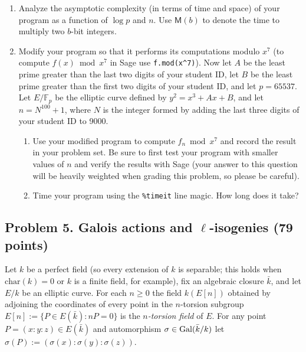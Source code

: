 \documentclass[11pt]{article}
\newcommand{\Fp}{\mathbb{F}_p}
\newcommand{\M}{\textsf{M}}
\newcommand{\Gal}{{\rm Gal}}
\newcommand{\kbar}{\bar{k}}
\begin{document}
\begin{enumerate}[{\bf (a)}]
\begin{itemize}
Implement a function that, given $k$, $v=[f_{k-3},\ldots,f_{k+5}]$, $F$, and a bit $b$, computes $k'=2k+b$ and $v=[f_{k'-3},\ldots,f_{k'+5}]$.  To perform left-to-right binary exponentiation, call this function repeatedly, passing in the bits of $n$ starting from either 2 or 3 bits from in the top and working down to the low order bit.
\item
To test your code, you can compare results with Sage, which already knows how to compute $f_n$, via
\begin{lstlisting}
FF=GF(p); R.<x>=PolynomialRing(FF)
E=EllipticCurve([FF(A),FF(B)])
E.division_polynomial(n,x,0)
\end{lstlisting}
\item
Your program should be quite fast, but be careful not to test it with values of $n$ that are too large --- the degree of $f_n$ is quadratic in $n$, so if $n$ is, say, a million, you would need several terabytes of memory to store $f_n$.
\end{itemize}
\item
Analyze the asymptotic complexity (in terms of time and space) of your program as a function of $\log p$ and $n$.
Use $\M(b)$ to denote the time to multiply two $b$-bit integers.

\item
Modify your program so that it performs its computations modulo $x^7$ (to compute $f(x)\bmod x^7$ in Sage use \texttt{f.mod(x\^{}7)}).
Now let $A$ be the least prime greater than the last two digits of your student ID, let $B$ be the least prime greater than the first two digits of your student ID, and let $p=65537$.  Let $E/\Fp$ be the elliptic curve defined by $y^2=x^3+Ax+B$, and let $n=N^{100}+1$, where $N$ is the integer formed by adding the last three digits of your student ID to 9000.
\begin{enumerate}[{\bf (i)}]
\item
Use your modified program to compute $f_n\bmod x^7$ and record the result in your problem set.
Be sure to first test your program with smaller values of $n$ and verify the results with Sage (your answer to this question will be heavily weighted when grading this problem, so please be careful).
\item
Time your program using the \texttt{\%timeit} line magic.  How long does it take?
\end{enumerate}
\end{enumerate}

\subsection*{Problem 5. Galois actions and $\ell$-isogenies (79 points)}
Let $k$ be a perfect field (so every extension of $k$ is separable; this holds when $\mathrm{char}(k)=0$ or $k$ is a finite field, for example), fix an algebraic closure $\kbar$, and let $E/k$ be an elliptic curve.  For each $n\ge 0$ the field $k(E[n])$ obtained by adjoining the coordinates of every point in the $n$-torsion subgroup $E[n]:=\{P\in E(\kbar):nP=0\}$ is the \emph{$n$-torsion field} of $E$.
For any point $P=(x:y:z)\in E(\kbar)$ and automorphism $\sigma\in\Gal(\kbar/k)$ let $\sigma(P):=(\sigma(x):\sigma(y):\sigma(z))$.
\end{document}
